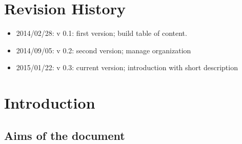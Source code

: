 



\usepackage{hyperref}
\usepackage{color}

\usepackage{afterpage}











\section{Revision History}

\begin{itemize}
	\item 2014/02/28: v 0.1: first version; build table of content.
	\item 2014/09/05: v 0.2: second version; manage organization
	\item 2015/01/22: v 0.3: current version; introduction with short description
\end{itemize} 



\section{Introduction}

\subsection{Aims of the document}

